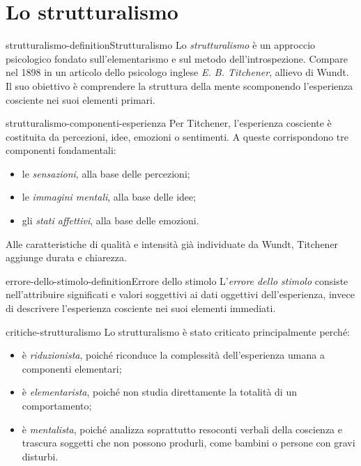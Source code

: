\documentclass[preview]{standalone}
\begin{document}
\genpage

\section{Lo strutturalismo}

\begin{snippetdefinition}{strutturalismo-definition}{Strutturalismo}
    Lo \emph{strutturalismo} è un approccio psicologico fondato
    sull'elementarismo e sul metodo dell'introspezione. Compare nel 1898 in un
    articolo dello psicologo inglese \emph{E. B. Titchener}, allievo di Wundt.
    Il suo obiettivo è comprendere la struttura della mente scomponendo
    l'esperienza cosciente nei suoi elementi primari.
\end{snippetdefinition}

\begin{snippet}{strutturalismo-componenti-esperienza}
    Per Titchener, l'esperienza cosciente è costituita da percezioni, idee,
    emozioni o sentimenti. A queste corrispondono tre componenti fondamentali:
    \begin{itemize}
        \item le \emph{sensazioni}, alla base delle percezioni;
        \item le \emph{immagini mentali}, alla base delle idee;
        \item gli \emph{stati affettivi}, alla base delle emozioni.
    \end{itemize}
    Alle caratteristiche di qualità e intensità già individuate da Wundt,
    Titchener aggiunge durata e chiarezza.
\end{snippet}

\begin{snippetdefinition}{errore-dello-stimolo-definition}{Errore dello stimolo}
    L'\emph{errore dello stimolo} consiste nell'attribuire significati e
    valori soggettivi ai dati oggettivi dell'esperienza, invece di descrivere
    l'esperienza cosciente nei suoi elementi immediati.
\end{snippetdefinition}

\begin{snippet}{critiche-strutturalismo}
    Lo strutturalismo è stato criticato principalmente perché:
    \begin{itemize}
        \item è \emph{riduzionista}, poiché riconduce la complessità
        dell'esperienza umana a componenti elementari;
        \item è \emph{elementarista}, poiché non studia direttamente la totalità
        di un comportamento;
        \item è \emph{mentalista}, poiché analizza soprattutto resoconti verbali
        della coscienza e trascura soggetti che non possono produrli, come
        bambini o persone con gravi disturbi.
    \end{itemize}
\end{snippet}
\end{document}
